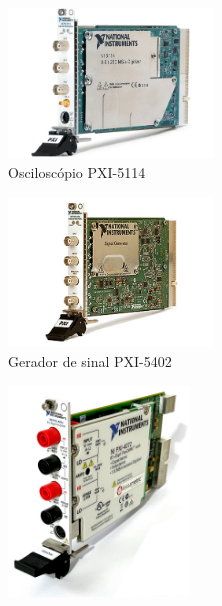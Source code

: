 \begin{figure}[hbtp]
    \centering
    \begin{subfigure}[hbtp]{0.48\textwidth}
        \centering
        \includegraphics[width=0.6\textwidth]{figures/PXI-5114.png}
        \caption{Osciloscópio PXI-5114 \cite{PXI-5114}}
        \label{fig:PXI-5114}
    \end{subfigure}
   \hfill   
   \vspace{0.5cm} %
\begin{subfigure}[hbtp]{0.48\textwidth}
        \centering
        \includegraphics[width=0.6\textwidth]{figures/PXI-5402.png}
        \caption{Gerador de sinal PXI-5402 \cite{PXI-5402}}
        \label{fig:PXI-5402}
    \end{subfigure}
  \vspace{0.1cm} %
\begin{subfigure}[hbtp]{0.48\textwidth}
        \centering
        \includegraphics[width=0.53\textwidth]{figures/PXI-4072.png}

\end{subfigure}
\end{figure}
